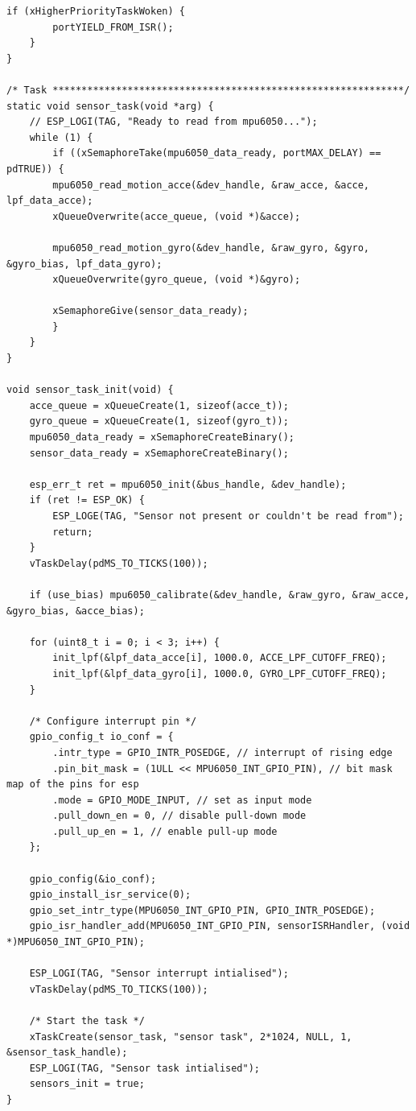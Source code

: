 \begin{lstlisting}[caption={Register Read}]
    if (xHigherPriorityTaskWoken) {
        portYIELD_FROM_ISR();
    }
}

/* Task *************************************************************/
static void sensor_task(void *arg) {
    // ESP_LOGI(TAG, "Ready to read from mpu6050...");
    while (1) {
        if ((xSemaphoreTake(mpu6050_data_ready, portMAX_DELAY) == pdTRUE)) {
        mpu6050_read_motion_acce(&dev_handle, &raw_acce, &acce, lpf_data_acce);
        xQueueOverwrite(acce_queue, (void *)&acce);

        mpu6050_read_motion_gyro(&dev_handle, &raw_gyro, &gyro, &gyro_bias, lpf_data_gyro);
        xQueueOverwrite(gyro_queue, (void *)&gyro);

        xSemaphoreGive(sensor_data_ready); 
        }
    }
}

void sensor_task_init(void) {
    acce_queue = xQueueCreate(1, sizeof(acce_t));
    gyro_queue = xQueueCreate(1, sizeof(gyro_t));
    mpu6050_data_ready = xSemaphoreCreateBinary();
    sensor_data_ready = xSemaphoreCreateBinary();

    esp_err_t ret = mpu6050_init(&bus_handle, &dev_handle);
    if (ret != ESP_OK) {
        ESP_LOGE(TAG, "Sensor not present or couldn't be read from");
        return;
    }
    vTaskDelay(pdMS_TO_TICKS(100)); 

    if (use_bias) mpu6050_calibrate(&dev_handle, &raw_gyro, &raw_acce, &gyro_bias, &acce_bias);

    for (uint8_t i = 0; i < 3; i++) {
        init_lpf(&lpf_data_acce[i], 1000.0, ACCE_LPF_CUTOFF_FREQ);
        init_lpf(&lpf_data_gyro[i], 1000.0, GYRO_LPF_CUTOFF_FREQ);
    }

    /* Configure interrupt pin */
    gpio_config_t io_conf = {
        .intr_type = GPIO_INTR_POSEDGE, // interrupt of rising edge
        .pin_bit_mask = (1ULL << MPU6050_INT_GPIO_PIN), // bit mask map of the pins for esp
        .mode = GPIO_MODE_INPUT, // set as input mode
        .pull_down_en = 0, // disable pull-down mode
        .pull_up_en = 1, // enable pull-up mode
    };
    
    gpio_config(&io_conf);
    gpio_install_isr_service(0);
    gpio_set_intr_type(MPU6050_INT_GPIO_PIN, GPIO_INTR_POSEDGE);
    gpio_isr_handler_add(MPU6050_INT_GPIO_PIN, sensorISRHandler, (void *)MPU6050_INT_GPIO_PIN);

    ESP_LOGI(TAG, "Sensor interrupt intialised");
    vTaskDelay(pdMS_TO_TICKS(100)); 

    /* Start the task */
    xTaskCreate(sensor_task, "sensor task", 2*1024, NULL, 1, &sensor_task_handle);
    ESP_LOGI(TAG, "Sensor task intialised");
    sensors_init = true; 
}


\end{lstlisting}
